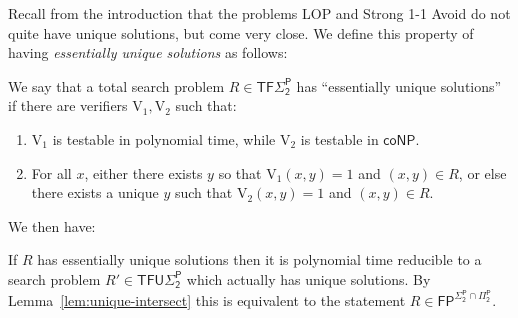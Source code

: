 Recall from the introduction that the problems {\sc LOP} and {\sc Strong 1-1 Avoid} do not quite have unique solutions, but come very close. We define this property of having \emph{essentially unique solutions} as follows:
\begin{definition}
We say that a total search problem $R \in \mathsf{TF\Sigma_2^P}$ has ``essentially unique solutions'' if there are verifiers $\mathrm{V_1}, \mathrm{V_2}$ such that:
\begin{enumerate}
    \item $\mathrm{V}_1$ is testable in polynomial time, while $\mathrm{V_2}$ is testable in $\mathsf{coNP}$.
    \item For all $x$, either there exists $y$ so that $\mathrm{V}_1(x,y)=1$ and $(x,y) \in R$, or else there exists a unique $y$ such that $\mathrm{V}_2(x,y)=1$ and $(x,y) \in R$.
\end{enumerate}
\end{definition}
We then have:
\begin{lemma}\label{lem:unique-sol}
If $R$ has essentially unique solutions then it is polynomial time reducible to a search problem $R' \in \mathsf{TFU\Sigma_2^P}$ which actually has unique solutions. By Lemma~\ref{lem:unique-intersect} this is equivalent to the statement $R \in \mathsf{FP^{\Sigma_2^P\cap \Pi_2^P}}$.
\end{lemma}
